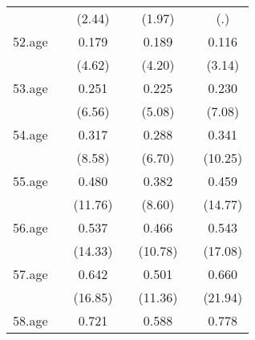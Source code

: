{\begin{tabular}{l*{6}{c}}
            &                     &      (2.44)         &                     &      (1.97)         &                     &         (.)         \\
[1em]
52.age      &                     &       0.179\sym{***}&                     &       0.189\sym{***}&                     &       0.116\sym{**} \\
            &                     &      (4.62)         &                     &      (4.20)         &                     &      (3.14)         \\
[1em]
53.age      &                     &       0.251\sym{***}&                     &       0.225\sym{***}&                     &       0.230\sym{***}\\
            &                     &      (6.56)         &                     &      (5.08)         &                     &      (7.08)         \\
[1em]
54.age      &                     &       0.317\sym{***}&                     &       0.288\sym{***}&                     &       0.341\sym{***}\\
            &                     &      (8.58)         &                     &      (6.70)         &                     &     (10.25)         \\
[1em]
55.age      &                     &       0.480\sym{***}&                     &       0.382\sym{***}&                     &       0.459\sym{***}\\
            &                     &     (11.76)         &                     &      (8.60)         &                     &     (14.77)         \\
[1em]
56.age      &                     &       0.537\sym{***}&                     &       0.466\sym{***}&                     &       0.543\sym{***}\\
            &                     &     (14.33)         &                     &     (10.78)         &                     &     (17.08)         \\
[1em]
57.age      &                     &       0.642\sym{***}&                     &       0.501\sym{***}&                     &       0.660\sym{***}\\
            &                     &     (16.85)         &                     &     (11.36)         &                     &     (21.94)         \\
[1em]
58.age      &                     &       0.721\sym{***}&                     &       0.588\sym{***}&                     &       0.778\sym{***}\\

\end{tabular}}
